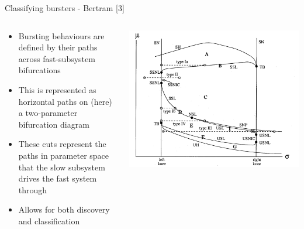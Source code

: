 \documentclass{beamer}
\begin{document}
\begin{frame}[label={sec:orgd4ac21e}]{Classifying bursters - Bertram [3]}
\begin{columns}
\begin{column}{0.5\columnwidth}
\begin{itemize}
\item Bursting behaviours are defined by their paths across fast-subsystem bifurcations
\item This is represented as horizontal paths on (here) a two-parameter bifurcation diagram
\item These cuts represent the paths in parameter space that the slow subsystem drives the fast system through
\item Allows for both discovery and classification
\end{itemize}
\end{column}

\begin{column}{0.5\columnwidth}
\begin{center}
\includegraphics[height=.8\textheight]{bertrambif.png}
\end{center}
\end{column}
\end{columns}
\end{frame}
\end{document}
